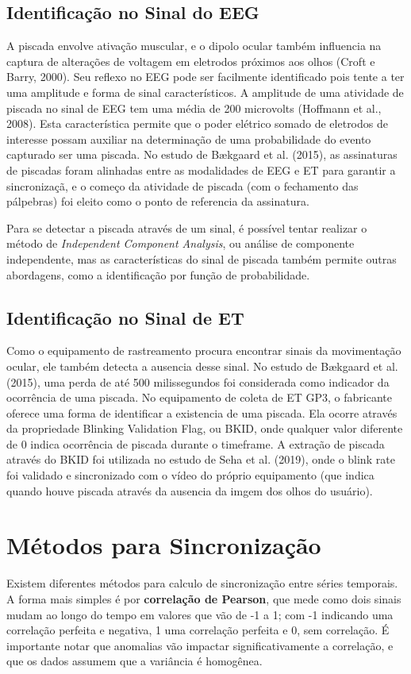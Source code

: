 \subsection{Identificação no Sinal do EEG}

A piscada envolve ativação muscular, e o dipolo ocular também influencia na captura de alterações de voltagem em eletrodos próximos aos olhos
(Croft e Barry, 2000). Seu reflexo no EEG pode ser facilmente identificado pois tente a ter uma amplitude e forma de sinal característicos. 
A amplitude de uma atividade de piscada no sinal de EEG tem uma média de 200 microvolts (Hoffmann et al., 2008). Esta característica permite
que o poder elétrico somado de eletrodos de interesse possam auxiliar na determinação de uma probabilidade do evento capturado ser uma piscada. 
No estudo de Bækgaard et al. (2015), as assinaturas de piscadas foram alinhadas entre as modalidades de EEG e ET para garantir a sincronizaçã, e
o começo da atividade de piscada (com o fechamento das pálpebras) foi eleito como o ponto de referencia da assinatura. 


Para se detectar a piscada através de um sinal, é possível tentar realizar o método de \textit{Independent Component Analysis}, ou análise de 
componente independente, mas as características do sinal de piscada também permite outras abordagens, como a identificação por função de probabilidade.


\subsection{Identificação no Sinal de ET}
Como o equipamento de rastreamento procura encontrar sinais da movimentação ocular, ele também detecta a ausencia desse sinal. No estudo 
de Bækgaard et al. (2015), uma perda de até 500 milissegundos foi considerada como indicador da ocorrência de uma piscada. No equipamento de coleta de ET GP3, 
o fabricante oferece uma forma de identificar a existencia de uma piscada. Ela ocorre através da propriedade Blinking Validation Flag, ou BKID, onde qualquer 
valor diferente de 0 indica ocorrência de piscada durante o timeframe. A extração de piscada através do BKID foi utilizada no estudo de Seha et al. (2019), 
onde o blink rate foi validado e sincronizado com o vídeo do próprio equipamento (que indica quando houve piscada através da ausencia da imgem dos olhos do usuário).



\section{Métodos para Sincronização}
Existem diferentes métodos para calculo de sincronização entre séries temporais. 
A forma mais simples é por \textbf{correlação de Pearson}, que mede como dois sinais mudam ao longo do tempo em valores que vão de -1 a 1;
com -1 indicando uma correlação perfeita e negativa, 1 uma correlação perfeita e 0, sem correlação. 
É importante notar que anomalias vão impactar significativamente a correlação, e que os dados assumem que a variância é homogênea. 

